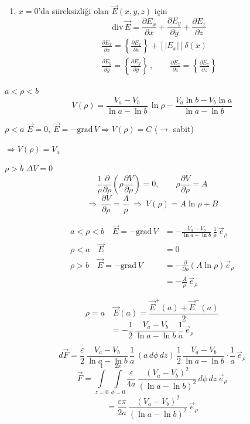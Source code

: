\documentclass[11pt,a4paper]{article}
\begin{document}
\begin{enumerate}[start=4]
\item $x=0$'da süreksizliği olan $\vec E(x,y,z)$ için
\[ \mathrm{div}\,\vec E=\frac{\partial E_x}{\partial x}+\frac{\partial E_y}{\partial y}+\frac{\partial E_z}{\partial z} \]
\begin{gather*}
\frac{\partial E_x}{\partial x}=\left\{\frac{\partial E_x}{\partial x}\right\}+\left[|E_x|\right]\delta(x)\\
\frac{\partial E_y}{\partial y}=\left\{\frac{\partial E_y}{\partial y}\right\}\,,\qquad\frac{\partial E_z}{\partial z}=\left\{\frac{\partial E_z}{\partial z}\right\}
\end{gather*}
\end{enumerate}

$a<\rho<b$
\[ V(\rho)=\frac{V_a-V_b}{\ln a-\ln b}\,\ln\rho-\frac{V_a\ln b-V_b\ln a}{\ln a-\ln b} \]

$\rho<a$ \quad $\vec E=0,\ \vec E=-\mathrm{grad}\,V\Rightarrow V(\rho)=C$ ($\to$ sabit)

$\Rightarrow V(\rho)=V_a$

$\rho>b$ \quad $\Delta V=0$
\[ \frac1\rho\frac{\partial}{\partial\rho}\left(\rho\frac{\partial V}{\partial\rho}\right)=0,\qquad \rho\frac{\partial V}{\partial\rho}=A \]
\[ \Rightarrow\ \frac{\partial V}{\partial\rho}=\frac{A}{\rho}\ \Rightarrow\ V(\rho)=A\ln\rho+B \]

\begin{align*}
a<\rho<b\quad \vec E=-\mathrm{grad}\,V&=-\frac{V_a-V_b}{\ln a-\ln b}\,\frac1\rho\,\vec e_\rho\\
\rho<a\quad \vec E&=0\\
\rho>b\quad \vec E=-\mathrm{grad}\,V&=-\frac{\partial}{\partial\rho}\left(A\ln\rho\right)\vec e_\rho\\
&=-\frac{A}{\rho}\,\vec e_\rho
\end{align*}

\[ \rho=a\quad \vec E(a)=\frac{\vec E^{+}(a)+\vec E^{-}(a)}{2} \]
\[ =-\frac12\,\frac{V_a-V_b}{\ln a-\ln b}\,\frac1a\,\vec e_\rho \]




\[ d\vec F=\frac{\varepsilon}{2}\,\frac{V_a-V_b}{\ln a-\ln b}\,\frac1a\,(a\,d\phi\,dz)\,\frac12\,\frac{V_a-V_b}{\ln a-\ln b}\cdot\frac1a\,\vec e_\rho \]
\[ \vec F=\int\limits_{z=0}^{1}\int\limits_{\phi=0}^{2\pi}\frac{\varepsilon}{4a}\,\frac{(V_a-V_b)^2}{(\ln a-\ln b)^2}\,d\phi\,dz\,\vec e_\rho \]
\[ =\frac{\varepsilon\pi}{2a}\,\frac{(V_a-V_b)^2}{(\ln a-\ln b)^2}\,\vec e_\rho \]
\end{document}
